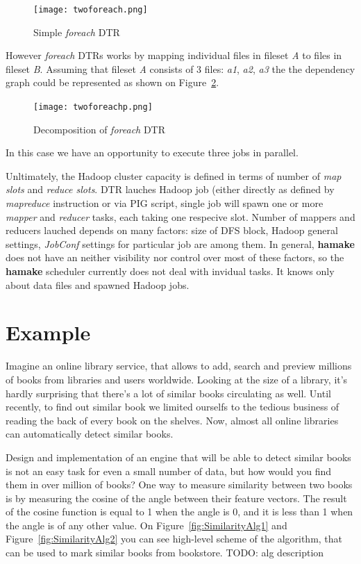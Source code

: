 \documentclass{article}
\begin{document}
\begin{figure}[htp]
\centering
\texttt{[image: twoforeach.png]}
\caption{Simple \emph{foreach} DTR}
\label{fig:foreach1}
\end{figure}

However \emph{foreach} DTRs works by mapping individual files in
fileset \textit{A} to files in fileset \textit{B}. Assuming that
fileset \textit{A} consists of 3 files: \textit{a1}, \textit{a2},
\textit{a3} the the dependency graph could be represented as shown on
Figure~\ref{fig:foreach2}.

\begin{figure}[htp]
\centering
\texttt{[image: twoforeachp.png]}
\caption{Decomposition of \emph{foreach} DTR}
\label{fig:foreach2}
\end{figure}

In this case we have an opportunity to execute three jobs in parallel.

Unltimately, the Hadoop cluster capacity is defined in terms of number
of \textit{map slots} and \textit{reduce slots}.  DTR lauches Hadoop
job (either directly as defined by \emph{mapreduce} instruction or via
PIG script, single job will spawn one or more \emph{mapper} and
\emph{reducer} tasks, each taking one respecive slot. Number of
mappers and reducers lauched depends on many factors: size of DFS
block, Hadoop general settings, \emph{JobConf} settings for particular
job are among them. In general, \textbf{hamake} does not have an neither
visibility nor control over most of these factors, so the \textbf{hamake}
scheduler currently does not deal with invidual tasks. It knows only
about data files and spawned Hadoop jobs.

\section{Example}

Imagine an online library service, that allows to add, search and preview millions
of books from libraries and users worldwide. Looking at the size of a library, it's hardly 
surprising that there's a lot of similar books circulating as well. Until recently, to find
out similar book we limited ourselfs to the tedious business of reading the back 
of every book on the shelves. Now, almost all online libraries can automatically detect similar books. 

Design and implementation of an engine that will be able to detect similar books is not an 
easy task for even a small number of data, but how would you find them in over million of books?
One way to measure similarity between two books is by measuring the cosine of the angle between their feature vectors\cite{wiki:cosinesimilarity}.
The result of the cosine function is equal to 1 when the angle is 0, and it is less than 1 when the angle is 
of any other value. On Figure~\ref{fig:SimilarityAlg1} and Figure~\ref{fig:SimilarityAlg2} you can see high-level scheme of
the algorithm, that can be used to mark similar books from bookstore. TODO: alg description
\end{document}
